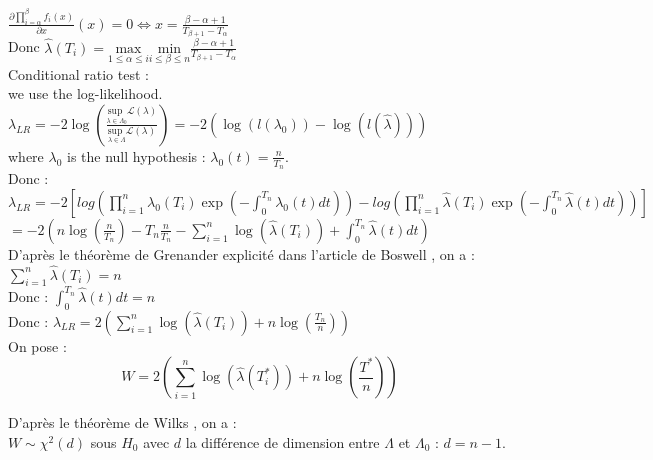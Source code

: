 \documentclass{journalstyle}
\begin{document}
$\frac{\partial \prod_{i=\alpha}^{\beta} f_i(x)}{\partial x}(x) = 0 \Leftrightarrow x = \frac{\beta - \alpha + 1}{T_{\beta + 1} - T_{\alpha}}$ \\
Donc $\hat{\lambda}(T_i) = \underset{1 \leq \alpha \leq i}{\text{max}} \underset{i \leq \beta \leq n}{\text{min}} \frac{\beta - \alpha + 1}{T_{\beta + 1} - T_{\alpha}}$ \\

Conditional ratio test : \\
we use the log-likelihood. \\
$\lambda_{LR} = -2 \log \left( \frac{\underset{\lambda \in \Lambda_0}{\text{sup }} \mathcal{L}(\lambda)}{\underset{\lambda \in \Lambda}{\text{sup }} \mathcal{L}(\lambda)}\right) = -2 ( \log (l(\lambda_0)) - \log (l(\hat{\lambda})))$ \\
where $\lambda_0$ is the null hypothesis : $\lambda_0(t) = \frac{n}{T_n}$. \\

Donc : \\
$\lambda_{LR} = -2 \left[ log\left(\prod_{i=1}^{n} \lambda_0(T_i) \exp(-\int_0^{T_n} \lambda_0(t) dt)\right) - log \left(\prod_{i=1}^{n} \hat{\lambda}(T_i) \exp(-\int_0^{T_n} \hat{\lambda}(t) dt)\right) \right]$ \\
$ = -2 \left( n \log(\frac{n}{T_n}) - T_n \frac{n}{T_n} - \sum_{i=1}^{n} \log(\hat{\lambda}(T_i)) + \int_0^{T_n} \hat{\lambda}(t) dt \right)$ \\

D'après le théorème de Grenander \cite{Grenander1956} explicité dans l'article de Boswell \cite{Boswell1966}, on a : \\
$\sum_{i=1}^{n} \hat{\lambda}(T_i) = n$ \\
Donc : $\int_0^{T_n} \hat{\lambda}(t) dt = n$ \\
Donc : $\lambda_{LR} = 2 \left( \sum_{i=1}^{n} \log(\hat{\lambda}(T_i)) + n \log(\frac{T_n}{n}) \right)$ \\

On pose : \\
\begin{equation}
    W = 2 \left( \sum_{i=1}^{n} \log(\hat{\lambda}(T^*_i)) + n \log(\frac{T^*}{n}) \right)
    \label{eq:boswell_test_statistic}
\end{equation}

D'après le théorème de Wilks \cite{Wilks1938}, on a : \\
$W \sim \chi^2(d)$ sous $H_0$ avec $d$ la différence de dimension entre $\Lambda$ et $\Lambda_0$ : $d = n - 1$. \\
\end{document}
